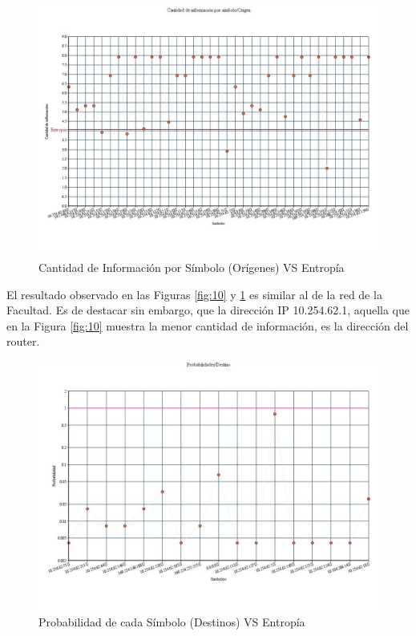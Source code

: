\begin{figure}[H]
  \centering
    \includegraphics[scale=0.45]{imagenes/graficos/entropiaCantInf/04origen.jpg}
  \caption{Cantidad de Información por Símbolo (Orígenes) VS Entropía}
  \label{fig:11}
\end{figure}

El resultado observado en las Figuras \ref{fig:10} y \ref{fig:11} es similar al de la red de la Facultad. Es de destacar sin embargo, que la dirección IP 10.254.62.1, aquella que en la Figura \ref{fig:10} muestra la menor cantidad de información, es la dirección del router.

\begin{figure}[H]
  \centering
    \includegraphics[scale=0.45]{imagenes/graficos/Probabilidades/04destino.jpg}
  \caption{Probabilidad de cada Símbolo (Destinos) VS Entropía}
  \label{fig:12}
\end{figure}

